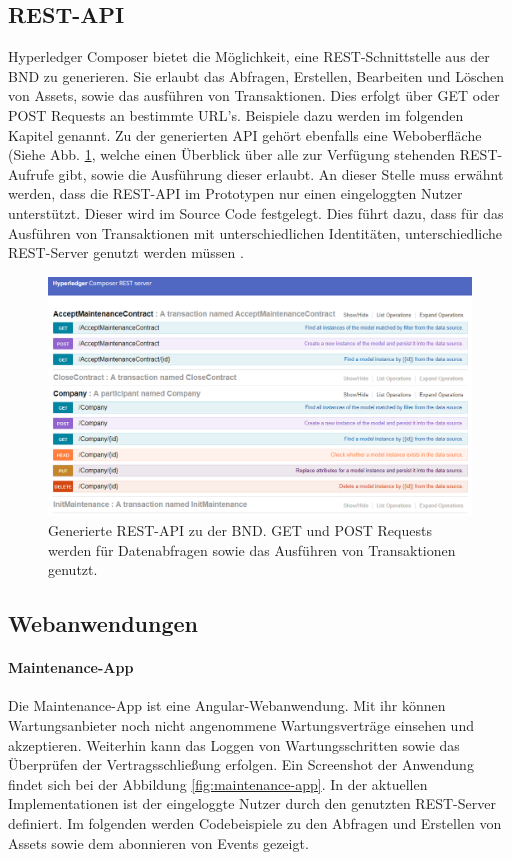 \subsection{REST-API}
\label{subsec:REST}
Hyperledger Composer bietet die Möglichkeit, eine REST-Schnittstelle aus der BND zu generieren. Sie erlaubt das Abfragen, Erstellen, Bearbeiten und Löschen von Assets, sowie das ausführen von Transaktionen. Dies erfolgt über GET oder POST Requests an bestimmte URL's. Beispiele dazu werden im folgenden Kapitel genannt. Zu der generierten API gehört ebenfalls eine Weboberfläche (Siehe Abb. \ref{fig:rest-api}, welche einen Überblick über alle zur Verfügung stehenden REST-Aufrufe gibt, sowie die Ausführung dieser erlaubt. An dieser Stelle muss erwähnt werden, dass die REST-API im Prototypen nur einen eingeloggten Nutzer unterstützt. Dieser wird im Source Code festgelegt. Dies führt dazu, dass für das Ausführen von Transaktionen mit unterschiedlichen Identitäten, unterschiedliche REST-Server genutzt werden müssen \cite{HyperledgerComposerTeamRESTAPIHyperledger}.

\begin{figure}[!htbp]
    \centering
      \includegraphics[width=1.0\textwidth,angle=0]{images/rest-api}
       \caption{Generierte REST-API zu der BND. GET und POST Requests werden für Datenabfragen sowie das Ausführen von Transaktionen genutzt.}
      \label{fig:rest-api}
\end{figure}

\subsection{Webanwendungen}

\paragraph{Maintenance-App}
Die Maintenance-App ist eine Angular-Webanwendung. Mit ihr können Wartungsanbieter noch nicht angenommene Wartungsverträge einsehen und akzeptieren. Weiterhin kann das Loggen von Wartungsschritten sowie das Überprüfen der Vertragsschließung erfolgen. Ein Screenshot der Anwendung findet sich bei der Abbildung \ref{fig:maintenance-app}. In der aktuellen Implementationen ist der eingeloggte Nutzer durch den genutzten REST-Server definiert. Im folgenden werden Codebeispiele zu den Abfragen und Erstellen von Assets sowie dem abonnieren von Events gezeigt.

